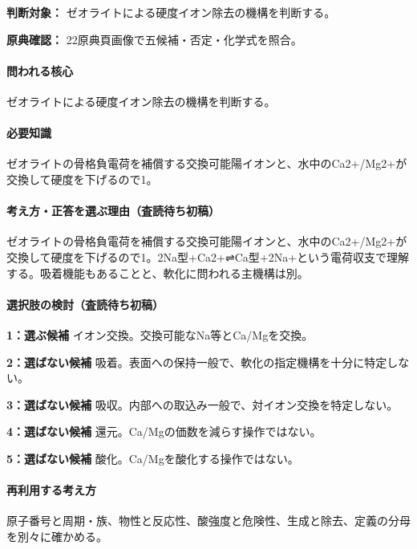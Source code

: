 \noindent\textbf{判断対象：} ゼオライトによる硬度イオン除去の機構を判断する。\par

\noindent\textbf{原典確認：} 22原典頁画像で五候補・否定・化学式を照合。\par

\paragraph{問われる核心} ゼオライトによる硬度イオン除去の機構を判断する。

\paragraph{必要知識} ゼオライトの骨格負電荷を補償する交換可能陽イオンと、水中のCa2+/Mg2+が交換して硬度を下げるので1。

\paragraph{考え方・正答を選ぶ理由（査読待ち初稿）} ゼオライトの骨格負電荷を補償する交換可能陽イオンと、水中のCa2+/Mg2+が交換して硬度を下げるので1。2Na型+Ca2+⇌Ca型+2Na+という電荷収支で理解する。吸着機能もあることと、軟化に問われる主機構は別。

\paragraph{選択肢の検討（査読待ち初稿）}\mbox{}\par

\noindent\textbf{1：選ぶ候補} イオン交換。交換可能なNa等とCa/Mgを交換。\par

\noindent\textbf{2：選ばない候補} 吸着。表面への保持一般で、軟化の指定機構を十分に特定しない。\par

\noindent\textbf{3：選ばない候補} 吸収。内部への取込み一般で、対イオン交換を特定しない。\par

\noindent\textbf{4：選ばない候補} 還元。Ca/Mgの価数を減らす操作ではない。\par

\noindent\textbf{5：選ばない候補} 酸化。Ca/Mgを酸化する操作ではない。\par

\paragraph{再利用する考え方} 原子番号と周期・族、物性と反応性、酸強度と危険性、生成と除去、定義の分母を別々に確かめる。

